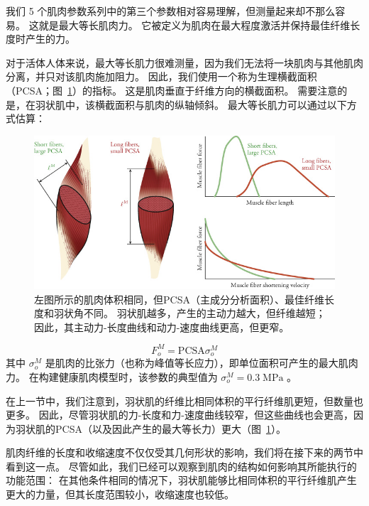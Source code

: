 我们 5 个肌肉参数系列中的第三个参数相对容易理解，但测量起来却不那么容易。
这就是最大等长肌肉力。
它被定义为肌肉在最大程度激活并保持最佳纤维长度时产生的力。


对于活体人体来说，最大等长肌力很难测量，因为我们无法将一块肌肉与其他肌肉分离，并只对该肌肉施加阻力。
因此，我们使用一个称为生理横截面积（PCSA；图~\ref{fig:5_5}）的指标。
这是肌肉垂直于纤维方向的横截面积。
需要注意的是，在羽状肌中，该横截面积与肌肉的纵轴倾斜。
最大等长肌力可以通过以下方式估算：

\begin{figure}[!htb]
	\centering
	\includegraphics[width=1.0\linewidth]{chap5/5_5}
	\caption{左图所示的肌肉体积相同，但PCSA（主成分分析面积）、最佳纤维长度和羽状角不同。
		羽状肌越多，产生的主动力越大，但纤维越短；
		因此，其主动力-长度曲线和动力-速度曲线更高，但更窄\cite{lieber2002skeletal}。 \label{fig:5_5}}
\end{figure}

\begin{equation}
	F_o^M = \text{PCSA} \sigma_o^M
	\label{eq:5_4}
\end{equation}
%
其中 $\sigma_o^M$ 是肌肉的比张力（也称为峰值等长应力），即单位面积可产生的最大肌肉力。
在构建健康肌肉模型时，该参数的典型值为 $\sigma_o^M = 0.3 \; \text{MPa}$ 。


在上一节中，我们注意到，羽状肌的纤维比相同体积的平行纤维肌更短，但数量也更多。
因此，尽管羽状肌的力-长度和力-速度曲线较窄，但这些曲线也会更高，因为羽状肌的PCSA（以及因此产生的最大等长力）更大（图~\ref{fig:5_5}）。


肌肉纤维的长度和收缩速度不仅仅受其几何形状的影响，我们将在接下来的两节中看到这一点。
尽管如此，我们已经可以观察到肌肉的结构如何影响其所能执行的功能范围：
在其他条件相同的情况下，羽状肌能够比相同体积的平行纤维肌产生更大的力量，但其长度范围较小，收缩速度也较低。



